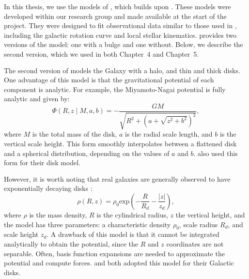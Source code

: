         In this thesis, we use the models of \citet{2017A&A...598A..66P}, which builds upon \citet{1991RMxAA..22..255A}. These models were developed within our research group and made available at the start of the project. They were designed to fit observational data similar to those used in \citet{2015ApJS..216...29B}, including the galactic rotation curve and local stellar kinematics. \citet{2017A&A...598A..66P} provides two versions of the model: one with a bulge and one without. Below, we describe the second version, which we used in both Chapter~4 and Chapter~5.

        The second version of \citet{2017A&A...598A..66P} models the Galaxy with a halo, and thin and thick disks. One advantage of this model is that the gravitational potential of each component is analytic. For example, the Miyamoto-Nagai potential \citep{1975PASJ...27..533M} is fully analytic and given by:
        \begin{equation}
            \Phi(R, z \mid M, a, b) = -\frac{G M}{\sqrt{R^2 + \left(a + \sqrt{z^2 + b^2}\right)^2}},
        \end{equation}
        where $M$ is the total mass of the disk, $a$ is the radial scale length, and $b$ is the vertical scale height. This form smoothly interpolates between a flattened disk and a spherical distribution, depending on the values of $a$ and $b$. \citet{2015ApJS..216...29B} also used this form for their disk model.

        However, it is worth noting that real galaxies are generally observed to have exponentially decaying disks \citep{1970ApJ...160..811F}:
        \begin{equation}
            \rho(R,z) = \rho_0 \mathrm{exp}\left(-\frac{R}{R_d}-\frac{|z|}{z_d}\right),
        \end{equation}
        where $\rho$ is the mass density, $R$ is the cylindrical radius, $z$ the vertical height, and the model has three parameters: a characteristic density $\rho_0$, scale radius $R_d$, and scale height $z_d$. A drawback of this model is that it cannot be integrated analytically to obtain the potential, since the $R$ and $z$ coordinates are not separable. Often, basis function expansions are needed to approximate the potential and compute forces. \citet{2017MNRAS.465...76M} and \citet{2024ApJ...967...89I} both adopted this model for their Galactic disks.

